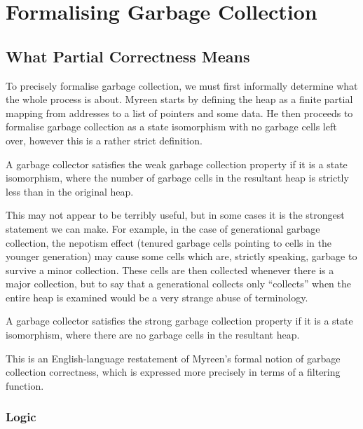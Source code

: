\chapter{Formalising Garbage Collection}

\section{What Partial Correctness Means}

To precisely formalise garbage collection, we must first informally
determine what the whole process is about. Myreen\cite{Myreen10}
starts by defining the heap as a finite partial mapping from addresses
to a list of pointers and some data. He then proceeds to formalise
garbage collection as a state isomorphism with no garbage cells left
over, however this is a rather strict definition.

\begin{definition}
  A garbage collector satisfies the weak garbage collection property
  if it is a state isomorphism, where the number of garbage cells in
  the resultant heap is strictly less than in the original heap.
\end{definition}

This may not appear to be terribly useful, but in some cases it is the
strongest statement we can make. For example, in the case of
generational garbage collection, the nepotism effect (tenured garbage
cells pointing to cells in the younger generation) may cause some
cells which are, strictly speaking, garbage to survive a minor
collection. These cells are then collected whenever there is a major
collection, but to say that a generational collects only ``collects''
when the entire heap is examined would be a very strange abuse of
terminology.

\begin{definition}
  A garbage collector satisfies the strong garbage collection property
  if it is a state isomorphism, where there are no garbage cells in
  the resultant heap.
\end{definition}

This is an English-language restatement of Myreen's formal notion of
garbage collection correctness, which is expressed more precisely in
terms of a filtering function.

\subsection{Logic}

